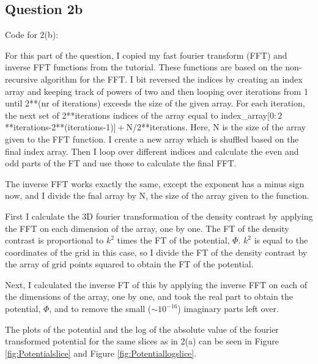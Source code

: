 \subsection{Question 2b}

Code for 2(b):


For this part of the question, I copied my fast fourier transform (FFT) and inverse FFT functions from the tutorial.
These functions are based on the non-recursive algorithm for the FFT.
I bit reversed the indices by creating an index array and keeping track of powers of two and then looping over iterations from 1 until 2**(nr of iterations) exceeds the size of the given array.
For each iteration, the next set of 2**iterations indices of the array equal to index_array$[0:2$**iterations-2**(iterations-1)$]+$N/2**iterations.
Here, N is the size of the array given to the FFT function.
I create a new array which is shuffled based on the final index array.
Then I loop over different indices and calculate the even and odd parts of the FT and use those to calculate the final FFT.

The inverse FFT works exactly the same, except the exponent has a minus sign now, and I divide the fnal array by N, the size of the array given to the function.

First I calculate the 3D fourier transformation of the density contrast by applying the FFT on each dimension of the array, one by one.
The FT of the density contrast is proportional to $k^2$ times the FT of the potential, $\Phi$.
$k^2$ is equal to the coordinates of the grid in this case, so I divide the FT of the density contrast by the array of grid points squared to obtain the FT of the potential.

Next, I calculated the inverse FT of this by applying the inverse FFT on each of the dimensions of the array, one by one, and took the real part to obtain the potential, $\Phi$, and to remove the small ($\sim 10^{-16}$) imaginary parts left over.

The plots of the potential and the log of the absolute value of the fourier transformed potential for the same slices as in 2(a) can be seen in Figure \ref{fig:Potentialslice} and Figure \ref{fig:Potentiallogslice}.

